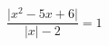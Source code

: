\begin{ex}[type=equation]
	\begin{condition}
		$\dfrac{\big | x^2 -5x + 6\big|}{\big|x\big| - 2} = 1$
	\end{condition}
	\answer{$\left\{4\right\}$}
\end{ex}